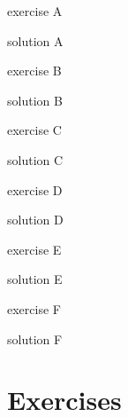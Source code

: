 \documentclass{article}
\begin{document}
\begin{exercise}[ID=A]
  exercise A
\end{exercise}
\begin{solution}
  solution A
\end{solution}
\begin{exercise}[ID=B]
  exercise B
\end{exercise}
\begin{solution}
  solution B
\end{solution}
\begin{exercise}[ID=C]
  exercise C
\end{exercise}
\begin{solution}
  solution C
\end{solution}
\begin{exercise}[ID=D]
  exercise D
\end{exercise}
\begin{solution}
  solution D
\end{solution}
\begin{exercise}[ID=E]
  exercise E
\end{exercise}
\begin{solution}
  solution E
\end{solution}
\begin{exercise}[ID=F]
  exercise F
\end{exercise}
\begin{solution}
  solution F
\end{solution}

\section*{Exercises}

\printsolutions
\end{document}
